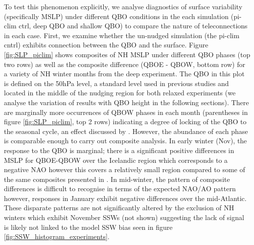 To test this phenomenon explicitly, we analyse  diagnostics of surface variability (specifically MSLP) under different QBO conditions in the each simulation (pi-clim ctrl, deep QBO and shallow QBO) to compare the nature of teleconnections in each case. First, we examine whether the un-nudged simulation (the pi-clim cntrl) exhibits connection between the QBO and the surface. Figure \ref{fig:SLP_piclim} shows composites of NH MSLP under different QBO phases (top two rows) as well as the composite difference (QBOE - QBOW, bottom row) for a variety of NH winter months from the deep experiment. The QBO in this plot is defined on the 50hPa level, a standard level used in previous studies \citep{ansteyHighlatitude2014b} and located in the middle of the nudging region for both relaxed experiments (we analyse the variation of results with QBO height in the following sections). There are marginally more occurrences of QBOW phases in each month (parentheses in figure \ref{fig:SLP_piclim}, top 2 rows) indicating a degree of locking of the QBO to the seasonal cycle, an effect discussed by \citep{rajendranSynchronisation2016b}. However, the abundance of each phase is comparable enough to carry out composite analysis. In early winter (Nov), the response to the QBO is marginal; there is a significant positive differences in MSLP for QBOE-QBOW over the Icelandic region which corresponds to a negative NAO however this covers a relatively small region compared to some of the same composites presented in \cite{andrewsObserved2019d}. In mid-winter, the pattern of composite differences is difficult to recognise in terms of the expected NAO/AO pattern however, responses in January exhibit negative differences over the mid-Atlantic. These disparate patterns are not significantly altered by the exclusion of NH winters which exhibit November SSWs (not shown) suggesting the lack of signal is likely not linked to the model SSW bias seen in figure \ref{fig:SSW_histogram_experiments}. 


